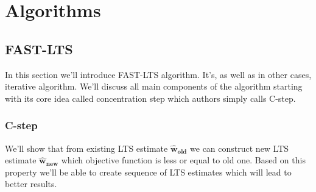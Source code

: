 \chapter{Algorithms}

\newcommand{\paramhat}[1]{\boldsymbol{\hat{\textbf{#1}}}}
\newcommand{\param}[1]{\textbf{\text{#1}}}
\newcommand\numberthis{\addtocounter{equation}{1}\tag{\theequation}}
\newcommand{\showVec}[3]{\vec{#1} = (\lowercase{#2}_1, \lowercase{#2}_2,\ldots,\lowercase{#2}_#3)}
\newcommand{\m}[1]{\boldsymbol{\uppercase{#1}}}

\let\vec\boldsymbol



\section{FAST-LTS}
In this section we'll introduce FAST-LTS algorithm\cite{rouss:2000}. 
It's, as well as in other cases, iterative algorithm. We'll discuss all main components
of the algorithm starting with its core idea called concentration step which 
authors simply calls C-step.


\subsection{C-step}
We'll show that from existing LTS estimate $\boldsymbol{\hat{w}_{old}}$ we 
can construct new LTS estimate $\boldsymbol{\hat{w}_{new}}$ which objective 
function is less or equal to old one. Based on this property we'll be able 
to create sequence of LTS estimates which will lead to better results.


\newcommand{\what}[1]{
	\vec{\hat{w}_#1}
}
\newcommand{\whatn}{
	\vec{\hat{w}}
}

